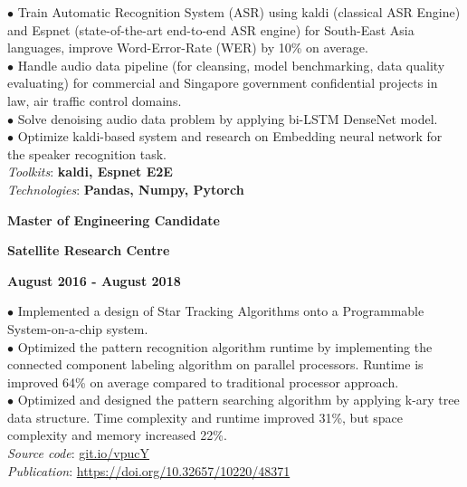 \documentclass[10pt]{article}
\begin{document}
        \vspace{-5mm}
        $\bullet$ {Train Automatic Recognition System (ASR) using kaldi (classical ASR Engine) and Espnet (state-of-the-art end-to-end ASR engine) for South-East Asia languages, improve Word-Error-Rate (WER) by 10\% on average.} \\
        $\bullet$ {Handle audio data pipeline (for cleansing, model benchmarking, data quality evaluating) for commercial and Singapore government confidential projects in law, air traffic control domains.} \\
        $\bullet$ {Solve denoising audio data problem by applying bi-LSTM DenseNet model.} \\
        $\bullet$ {Optimize kaldi-based system and research on Embedding neural network for the speaker recognition task.} \\
        \emph{Toolkits}: \textbf{kaldi, Espnet E2E} \\
        \emph{Technologies}: \textbf{Pandas, Numpy, Pytorch}


        \begin{multicols}{3}
            \begin{flushleft}
                \textbf{Master of Engineering Candidate}
            \end{flushleft}

            \columnbreak

            \begin{center}
                \textbf{Satellite Research Centre}
            \end{center}

            \columnbreak

            \begin{flushright}
                \textbf{August 2016 - August 2018}
            \end{flushright}
        \end{multicols}

        \vspace{-5mm}

        $\bullet$ {Implemented a design of Star Tracking Algorithms onto a Programmable System-on-a-chip system. }\\
        $\bullet$ {Optimized the pattern recognition algorithm runtime by implementing the connected component labeling algorithm on parallel processors. Runtime is improved 64\% on average compared to traditional processor approach.} \\
        $\bullet$ {Optimized and designed the pattern searching algorithm by applying k-ary tree data structure. Time complexity and runtime improved 31\%, but space complexity and memory increased 22\%.} \\
        \emph{Source code}: \href{https://git.io/vpucY}{git.io/vpucY} \\
        \emph{Publication}: \href{https://doi.org/10.32657/10220/48371}{https://doi.org/10.32657/10220/48371}
\end{document}
